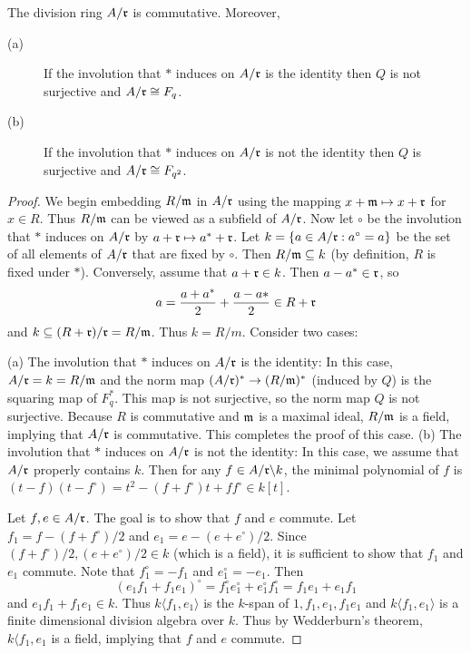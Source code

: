 \begin{proposition}
The division ring $A/\mathfrak{r}$ is commutative. Moreover,
\begin{description}
\item[(a)] If the involution that $*$ induces on $A/\mathfrak{r}$ is the identity then $Q$ is not surjective and $A/\mathfrak{r} \cong F_q$.
\item[(b)] If the involution that $*$ induces on $A/\mathfrak{r}$ is not the identity then $Q$ is surjective and $A/\mathfrak{r} \cong F_{q^2}$.
\end{description}
\end{proposition}
\begin{proof}
We begin embedding $R/\mathfrak{m}$ in $A/\mathfrak{r}$ using the mapping $x + \mathfrak{m} \mapsto x + \mathfrak{r}$ for $x \in R$.
Thus $R/\mathfrak{m}$ can be viewed as a subfield of $A/\mathfrak{r}$.
Now let $\circ$ be the involution that $*$ induces on $A/\mathfrak{r}$ by $a + \mathfrak{r} \mapsto a^* + \mathfrak{r}$.
Let $k = \{a \in A/\mathfrak{r} : a^\circ = a \}$ be the set of all elements of $A/\mathfrak{r}$ that are fixed by $\circ$.
Then $R/\mathfrak{m} \subseteq k$ (by definition, $R$ is fixed under $*$).
Conversely, assume that $a + \mathfrak{r} \in k$.
Then $a - a^* \in \mathfrak{r}$, so
\[
a = \frac{a + a^*}{2} + \frac{a - a*}{2} \in R + \mathfrak{r}
\]
and $k \subseteq (R + \mathfrak{r})/\mathfrak{r} = R/\mathfrak{m}$. Thus $k = R/m$.
Consider two cases:

(a) The involution that $*$ induces on $A/\mathfrak{r}$ is the identity: In this case, $A/\mathfrak{r} = k = R/\mathfrak{m}$ and the norm map $(A/\mathfrak{r})^* \to (R/\mathfrak{m})^*$ (induced by $Q$) is the squaring map of $F_q^*$.
This map is not surjective, so the norm map $Q$ is not surjective.
Because $R$ is commutative and $\mathfrak{m}$ is a maximal ideal, $R/\mathfrak{m}$ is a field, implying that $A/\mathfrak{r}$ is commutative.
This completes the proof of this case.
(b) The involution that $*$ induces on $A/\mathfrak{r}$ is not the identity: In this case, we assume that $A/\mathfrak{r}$ properly contains $k$.
Then for any $f \in A/\mathfrak{r} \backslash k$, the minimal polynomial of $f$ is $(t - f)(t - f^\circ) = t^2 - (f + f^\circ)t + f f^\circ \in k[t]$.

Let $f, e \in A/\mathfrak{r}$.
The goal is to show that $f$ and $e$ commute.
Let $f_1 = f - (f + f^\circ) / 2$ and $e_1 = e - (e + e^\circ) / 2$.
Since $(f + f^\circ)/2, (e + e^\circ)/2 \in k$ (which is a field), it is sufficient to show that $f_1$ and $e_1$ commute.
Note that $f_1^\circ = -f_1$ and $e_1^\circ = -e_1$.
Then
\[
(e_1 f_1 + f_1 e_1)^\circ = f_1^\circ e_1^\circ + e_1^\circ f_1^\circ = f_1 e_1 + e_1 f_1
\]
and $e_1 f_1 + f_1 e_1 \in k$.
Thus $k\langle f_1, e_1 \rangle$ is the $k$-span of $1, f_1, e_1, f_1 e_1$ and $k \langle f_1, e_1 \rangle$ is a finite dimensional division algebra over $k$.
Thus by Wedderburn's theorem, $k \langle f_1, e_1$ is a field, implying that $f$ and $e$ commute.


\end{proof}
